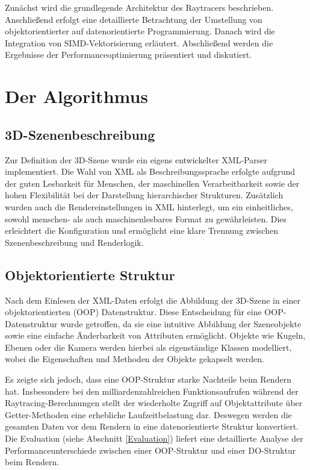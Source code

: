 \documentclass[sigconf]{acmart}
\begin{document}
Zunächst wird die grundlegende Architektur des Raytracers beschrieben.
Anschließend erfolgt eine detaillierte Betrachtung der Umstellung von objektorientierter auf datenorientierte Programmierung.
Danach wird die Integration von SIMD-Vektorisierung erläutert.
Abschließend werden die Ergebnisse der Performanceoptimierung präsentiert und diskutiert.

\section{Der Algorithmus} \label{Algorithmus}  %
\subsection{3D-Szenenbeschreibung} \label{Szenenbeschreibung}
Zur Definition der 3D-Szene wurde ein eigens entwickelter XML-Parser implementiert.
Die Wahl von XML als Beschreibungssprache erfolgte aufgrund der guten Lesbarkeit für Menschen, der maschinellen Verarbeitbarkeit sowie der hohen Flexibilität bei der Darstellung hierarchischer Strukturen.
Zusätzlich wurden auch die Rendereinstellungen in XML hinterlegt, um ein einheitliches, sowohl menschen- als auch maschinenlesbares Format zu gewährleisten.
Dies erleichtert die Konfiguration und ermöglicht eine klare Trennung zwischen Szenenbeschreibung und Renderlogik.

\subsection{Objektorientierte Struktur} \label{OOP}
Nach dem Einlesen der XML-Daten erfolgt die Abbildung der 3D-Szene in einer objektorientierten (OOP) Datenstruktur.
Diese Entscheidung für eine OOP-Datenstruktur wurde getroffen, da sie eine intuitive Abbildung der Szeneobjekte sowie eine einfache Änderbarkeit von Attributen ermöglicht.
Objekte wie Kugeln, Ebenen oder die Kamera werden hierbei als eigenständige Klassen modelliert, wobei die Eigenschaften und Methoden der Objekte gekapselt werden.


Es zeigte sich jedoch, dass eine OOP-Struktur starke Nachteile beim Rendern hat.
Insbesondere bei den milliardenzahlreichen Funktionsaufrufen während der Raytracing-Berechnungen stellt der wiederholte Zugriff auf Objektattribute über Getter-Methoden eine erhebliche Laufzeitbelastung dar. 
Deswegen werden die gesamten Daten vor dem Rendern in eine datenorientierte Struktur konvertiert.
Die Evaluation (siehe Abschnitt \ref{Evaluation}) liefert eine detaillierte Analyse der Performanceunterschiede zwischen einer OOP-Struktur und einer DO-Struktur beim Rendern.
\end{document}
